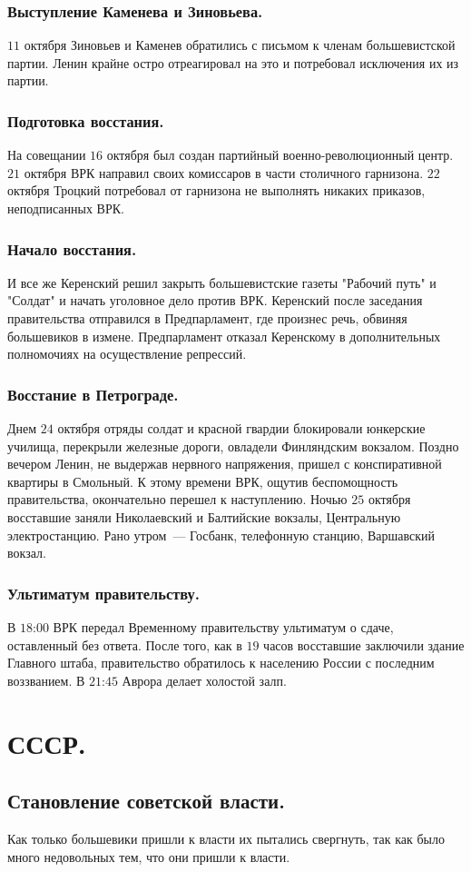 \documentclass[12pt]{article}
\begin{document}
	\subsubsection{Выступление Каменева и Зиновьева.}
	$11$ октября Зиновьев и Каменев обратились с письмом к членам большевистской партии. Ленин крайне остро отреагировал на это и потребовал исключения их из партии.
	\subsubsection{Подготовка восстания.}
	На совещании $16$ октября был создан партийный военно-революционный центр. $21$ октября ВРК направил своих комиссаров в части столичного гарнизона. $22$ октября Троцкий потребовал от гарнизона не выполнять никаких приказов, неподписанных ВРК.
	\subsubsection{Начало восстания.}
	И все же Керенский решил закрыть большевистские газеты "Рабочий путь" и "Солдат" и начать уголовное дело против ВРК. Керенский после заседания правительства отправился в Предпарламент, где произнес речь, обвиняя большевиков в измене. Предпарламент отказал Керенскому в дополнительных полномочиях на осуществление репрессий.
	\subsubsection{Восстание в Петрограде.}
	Днем $24$ октября отряды солдат и красной гвардии блокировали юнкерские училища, перекрыли железные дороги, овладели Финляндским вокзалом. Поздно вечером Ленин, не выдержав нервного напряжения, пришел с конспиративной квартиры в Смольный. К этому времени ВРК, ощутив беспомощность правительства, окончательно перешел к наступлению. Ночью $25$ октября восставшие заняли Николаевский и Балтийские вокзалы, Центральную электростанцию. Рано утром~--- Госбанк, телефонную станцию, Варшавский вокзал.
	\subsubsection{Ультиматум правительству.}
	В $18$:$00$ ВРК передал Временному правительству ультиматум о сдаче, оставленный без ответа. После того, как в $19$ часов восставшие заключили здание Главного штаба, правительство обратилось к населению России с последним воззванием. В $21$:$45$ Аврора делает холостой залп.
	\section{СССР.}
	\subsection{Становление советской власти.}
	Как только большевики пришли к власти их пытались свергнуть, так как было много недовольных тем, что они пришли к власти.
\end{document}
